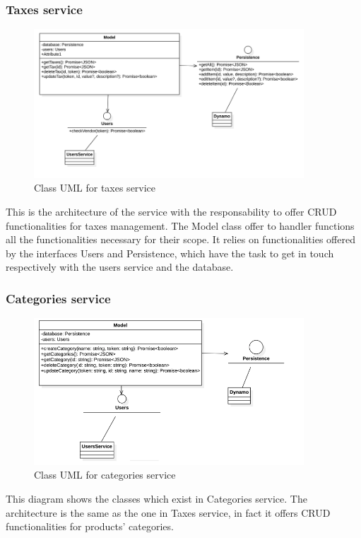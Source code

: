 \subsubsection{Taxes service}
\begin{figure}[H]
    \includegraphics[width=0.9\textwidth]{res/images/class-diagrams/taxes.png}
    \caption{Class UML for taxes service}
\end{figure}
This is the architecture of the service with the responsability to offer CRUD functionalities for taxes management.
The Model class offer to handler functions all the functionalities necessary for their scope. It relies on functionalities
offered by the interfaces Users and Persistence, which have the task to get in touch respectively with the users service and the
database.

\subsubsection{Categories service}
\begin{figure}[H]
    \includegraphics[width=0.9\textwidth]{res/images/class-diagrams/categories.png}
    \caption{Class UML for categories service}
\end{figure}
This diagram shows the classes which exist in Categories service. The architecture is the same as the one in Taxes service,
in fact it offers CRUD functionalities for products' categories.

